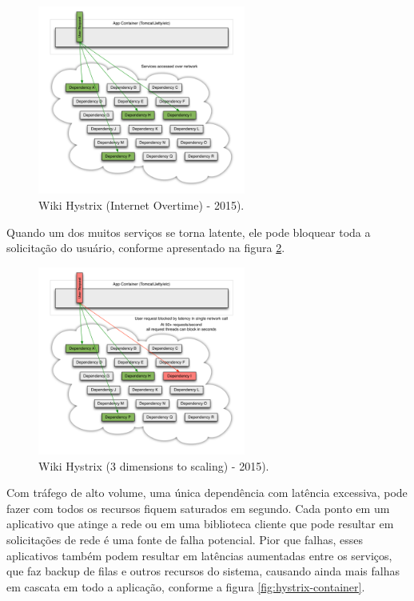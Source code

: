 \begin{figure}[h]
\centering
\includegraphics[height=6.2cm]{imagens/figura3}
\caption{Wiki Hystrix (Internet Overtime) - 2015).}
\label{fig:hystrix-overtime}
\end{figure}

Quando um dos muitos serviços se torna latente, ele pode bloquear toda a solicitação do usuário, conforme apresentado na figura \ref{fig:hystrix-dimensions-scaling}.

\begin{figure}[h]
\centering
\includegraphics[height=6.2cm]{imagens/figura4}
\caption{Wiki Hystrix (3 dimensions to scaling) - 2015).}
\label{fig:hystrix-dimensions-scaling}
\end{figure}

Com tráfego de alto volume, uma única dependência com latência excessiva, pode fazer com todos os recursos fiquem saturados em segundo. Cada ponto em um aplicativo que atinge a rede ou em uma biblioteca cliente que pode resultar em solicitações de rede é uma fonte de falha potencial. Pior que falhas, esses aplicativos também podem resultar em latências aumentadas entre os serviços, que faz backup de filas e outros recursos do sistema, causando ainda mais falhas em cascata em todo a aplicação, conforme a figura \ref{fig:hystrix-container}.

